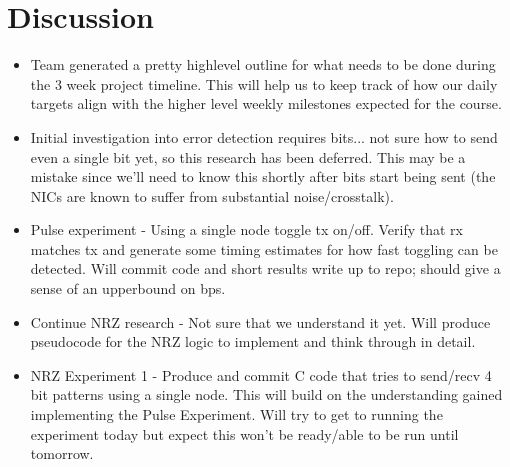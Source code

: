 \documentclass{article}
\begin{document}
\section*{Discussion}
\begin{itemize}
\item Team generated a pretty highlevel outline for what needs to be done during
the 3 week project timeline. This will help us to keep track of how our daily
targets align with the higher level weekly milestones expected for the course.
\item Initial investigation into error detection requires bits... not sure how to
send even a single bit yet, so this research has been deferred. This may be a
mistake since we'll need to know this shortly after bits start being sent (the NICs
are known to suffer from substantial noise/crosstalk).
\item Pulse experiment - Using a single node toggle tx on/off. Verify that rx
matches tx and generate some timing estimates for how fast toggling can be
detected. Will commit code and short results write up to repo; should give a sense
of an upperbound on bps.
\item Continue NRZ research - Not sure that we understand it yet. Will produce
pseudocode for the NRZ logic to implement and think through in detail.
\item NRZ Experiment 1 - Produce and commit C code that tries to send/recv 4 bit
patterns using a single node. This will build on the understanding gained
implementing the Pulse Experiment. Will try to get to running the experiment today
but expect this won't be ready/able to be run until tomorrow.
\end{itemize}

\end{document}
